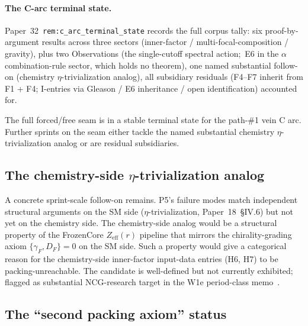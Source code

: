 \documentclass[11pt,a4paper]{article}
\theoremstyle{plain}
\theoremstyle{definition}
\newcommand{\reff}{Z_{\mathrm{eff}}}
\begin{document}
\paragraph{The C-arc terminal state.} Paper~32~\texttt{rem:c\_arc\_terminal\_state} records the full corpus tally:  six proof-by-argument results across three sectors (inner-factor / multi-focal-composition / gravity), plus two Observations (the single-cutoff spectral action;\ E6 in the $\alpha$ combination-rule sector, which holds no theorem), one named substantial follow-on (chemistry $\eta$-trivialization analog), all subsidiary residuals (F4--F7 inherit from F1 + F4;  I-entries via Gleason / E6 inheritance / open identification) accounted for.

The full forced/free seam is in a stable terminal state for the path-\#1 vein C arc.  Further sprints on the seam either tackle the named substantial chemistry $\eta$-trivialization analog or are residual subsidiaries.

\subsection{The chemistry-side $\eta$-trivialization analog}
\label{sec:open_chem_eta}

A concrete sprint-scale follow-on remains.  P5's failure modes match independent structural arguments on the SM side ($\eta$-trivialization, Paper~18~\S IV.6) but not yet on the chemistry side.  The chemistry-side analog would be a structural property of the FrozenCore $\reff(r)$ pipeline that mirrors the chirality-grading axiom $\{\gamma_F, D_F\} = 0$ on the SM side.  Such a property would give a categorical reason for the chemistry-side inner-factor input-data entries (H6, H7) to be packing-unreachable.  The candidate is well-defined but not currently exhibited; flagged as substantial NCG-research target in the W1e period-class memo~\cite{debug_w1e}.

\subsection{The ``second packing axiom'' status}
\label{sec:open_second_packing}
\end{document}
